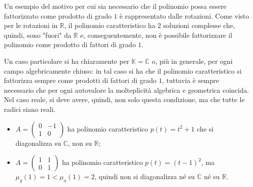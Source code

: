 \begin{remark}
    Un esempio del motivo per cui sia necessario che il polinomio possa essere fattorizzato come prodotto di grado $1$ è rappresentato dalle rotazioni. Come visto per le rotazioni in $\mathbb{R}$, il polinomio caratteristico ha $2$ soluzioni complesse che, quindi, sono "fuori" da $\mathbb{R}$ e, conseguentemente, non è possibile fattorizzare il polinomio come prodotto di fattori di grado $1$.
\end{remark}
Un caso particolare si ha chiaramente per $\mathbb{K} = \mathbb{C}$ o, più in generale, per ogni campo algebricamente chiuso: in tal caso si ha che il polinomio caratteristico si fattorizza sempre come prodotti di fattori di grado $1$, tuttavia è sempre necessario che per ogni autovalore la molteplicità algebrica e geometrica coincida. Nel caso reale, si deve avere, quindi, non solo questa condizione, ma che tutte le radici siano reali.
\begin{example} \hspace{1cm}
    \begin{itemize}
        \item $A = \begin{pmatrix}
            0 & -1 \\
            1 & 0
        \end{pmatrix}$ ha polinomio caratteristico $p(t) = t^2 + 1$ che si diagonalizza su $\mathbb{C}$, non su $\mathbb{R}$;
        \item $A = \begin{pmatrix}
            1 & 1 \\
            0 & 1
        \end{pmatrix}$ ha polinomio caratteristico $p(t) = (t-1)^2$, ma $\mu_g(1) = 1 < \mu_a(1) = 2$, quindi non si diagonalizza né su $\mathbb{C}$ né su $\mathbb{R}$.
    \end{itemize}
\end{example}
